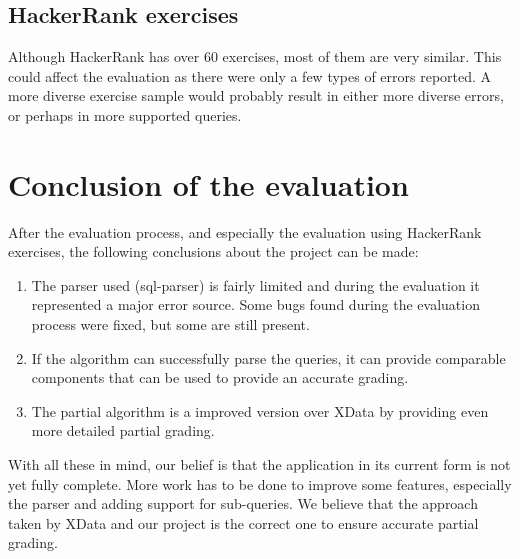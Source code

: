 \subsection{HackerRank exercises}
Although HackerRank has over 60 exercises, most of them are very similar. This could affect the evaluation as there were only a few types of errors reported. A more diverse exercise sample would probably result in either more diverse errors, or perhaps in more supported queries.

\section{Conclusion of the evaluation}
After the evaluation process, and especially the evaluation using HackerRank exercises, the following conclusions about the project can be made:
\begin{enumerate}
    \item The parser used (sql-parser) is fairly limited and during the evaluation it represented a major error source. Some bugs found during the evaluation process were fixed, but some are still present.
    \item If the algorithm can successfully parse the queries, it can provide comparable components that can be used to provide an accurate grading.
    \item The partial algorithm is a improved version over XData by providing even more detailed partial grading.
\end{enumerate}

With all these in mind, our belief is that the application in its current form is not yet fully complete. More work has to be done to improve some features, especially the parser and adding support for sub-queries. We believe that the approach taken by XData and our project is the correct one to ensure accurate partial grading.